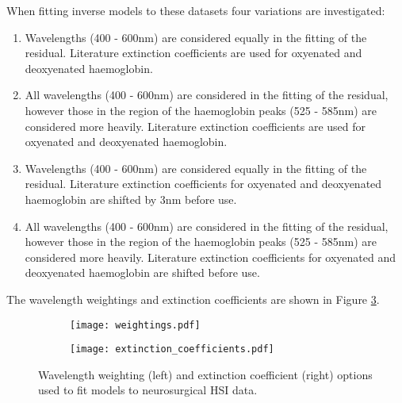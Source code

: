 When fitting inverse models to these datasets four variations are investigated: 
\begin{enumerate}
    \item Wavelengths (400 - 600nm) are considered equally in the fitting of the residual. Literature extinction coefficients are used for oxyenated and deoxyenated haemoglobin. 
    \item All wavelengths (400 - 600nm) are considered in the fitting of the residual, however those in the region of the haemoglobin peaks (525 - 585nm) are considered more heavily. Literature extinction coefficients are used for oxyenated and deoxyenated haemoglobin. 
    \item Wavelengths (400 - 600nm) are considered equally in the fitting of the residual. Literature extinction coefficients for oxyenated and deoxyenated haemoglobin are shifted by 3nm before use. 
    \item All wavelengths (400 - 600nm) are considered in the fitting of the residual, however those in the region of the haemoglobin peaks (525 - 585nm) are considered more heavily. Literature extinction coefficients for oxyenated and deoxyenated haemoglobin are shifted before use.
    \label{ls:fittingmethods}
\end{enumerate}
The wavelength weightings and extinction coefficients are shown in Figure \ref{fig:fittingoptions}. 
\begin{figure}[h!]
    \centering
    \begin{subfigure}{0.49\textwidth}
        \texttt{[image: weightings.pdf]}
        \caption{}
        \label{fig:weightings}
    \end{subfigure}
    \begin{subfigure}{0.49\textwidth}
        \texttt{[image: extinction\_coefficients.pdf]}
        \caption{}
        \label{fig:extinctioncoeffs}
    \end{subfigure}
    \caption{Wavelength weighting (left) and extinction coefficient (right) options used to fit models to neurosurgical HSI data.}
    \label{fig:fittingoptions}
\end{figure}

